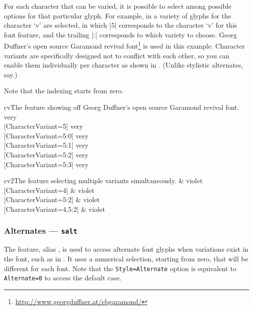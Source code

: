 For each character that can be varied, it is possible to select among
possible options for that particular glyph.
For example, in  a variety of glyphs for the character `v' are
selected, in which |5| corresponds to the character `v' for this font feature,
and the trailing |:| corresponds to which variety to choose.
Georg Duffner's open source Garamond revival font\footnote{\url{http://www.georgduffner.at/ebgaramond/}} is used in this example.
Character variants are specifically designed not to conflict with each
other, so you can enable them individually per character as shown in
. (Unlike stylistic alternates, say.)

Note that the indexing starts from zero.

\begin{Lexample}[firstline=2]{cv}{The  feature showing off Georg Duffner's open source Garamond revival font.}
  \huge
                         very \\
  [CharacterVariant=5]   very \\
  [CharacterVariant=5:0] very \\
  [CharacterVariant=5:1] very \\
  [CharacterVariant=5:2] very \\
  [CharacterVariant=5:3] very
\end{Lexample}

\begin{Lexample}[firstline=2]{cv2}{The  feature selecting multiple variants simultaneously.}
  \huge
                             \& violet \\
  [CharacterVariant={4}]     \& violet \\
  [CharacterVariant={5:2}]   \& violet \\
  [CharacterVariant={4,5:2}] \& violet
\end{Lexample}

\subsubsection{Alternates --- \texttt{salt}}

The  feature, alias , is used to access alternate font glyphs when variations exist in the font, such as in .
It uses a numerical selection, starting from zero, that will be different for each font.
Note that the \texttt{Style=Alternate} option is equivalent
to \texttt{Alternate=0} to access the default case.

